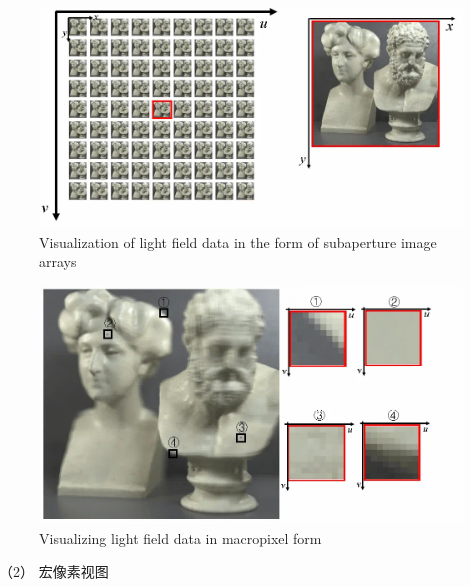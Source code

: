 \begin{figure}[!ht]
	\centering
	\includegraphics[width=0.80\linewidth]{figures/chapter2/multi_photo}
	{Visualization of light field data in the form of subaperture image arrays}  
	\label{chapter2_fig5:multi_photo}
\end{figure}
%
%
%
%
\begin{figure}[!ht]
	\centering
	\includegraphics[width=0.73\linewidth]{figures/chapter2/macro_photo}
	{Visualizing light field data in macropixel form}  
	\label{cpt2_fig5:macro_photo}
\end{figure}
%
%
%
%



（2）
宏像素视图





